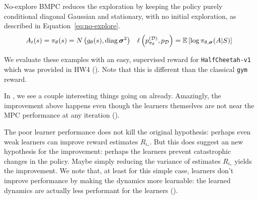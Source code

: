 \documentclass{article}
\begin{document}
No-explore \textsc{BMPC} reduces the exploration by keeping the policy purely conditional diagonal Gaussian and stationary, with no initial exploration, as described in Equation~\ref{eq:no-explore}.
\begin{align} \label{eq:no-explore}
  A_t(s)= \pi_\theta(s)=N\left({g_\theta(s), \operatorname{diag}{\boldsymbol\sigma}^2}\right) && \ell\left({p_{\pi_\theta}^{(\mathcal{D})},p_{\mathcal{D}}}\right)=\operatorname{\mathbb{E}}\left[{\log \pi_{\theta,{\boldsymbol\sigma}}(A|S)}\right]
\end{align}

We evaluate these examples with an easy, supervised reward for \texttt{HalfCheetah-v1} which was provided in HW4 (). Note that this is different than the classical \texttt{gym} reward.


In , we see a couple interesting things going on already. Amazingly, the improvement above happens even though the learners themselves are not near the MPC performance at any iteration ().


The poor learner performance does not kill the original hypothesis: perhaps even weak learners can improve reward estimates $R_{i_*}$. But this does suggest an new hypothesis for the improvement: perhaps the learners prevent catastrophic changes in the policy. Maybe simply reducing the variance of estimates $R_{i_*}$ yields the improvement. We note that, at least for this simple case, learners don't improve performance by making the dynamics more learnable: the learned dynamics are actually less performant for the learners ().

\end{document}
